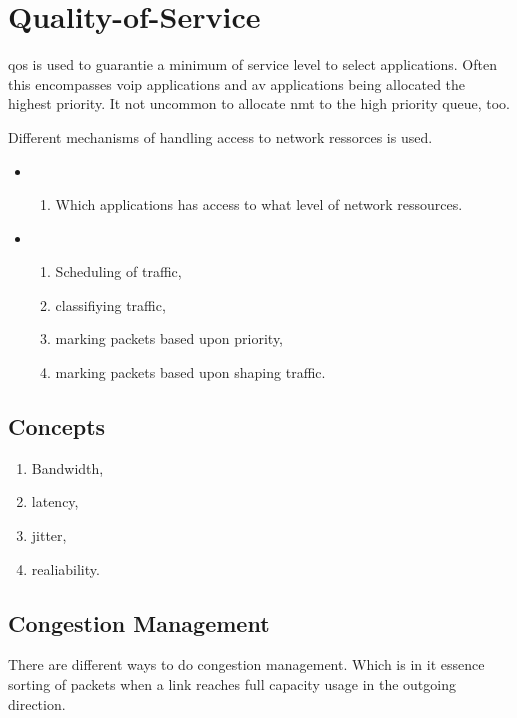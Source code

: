 \chapter[QoS]{Quality-of-Service}

\gls{qos} is used to guarantie a minimum of service level to select applications. Often this encompasses \gls{voip} applications and \gls{av} applications being allocated the highest priority. It not uncommon to allocate \gls{nmt} to the high priority queue, too.

Different mechanisms of handling access to network ressorces is used.
\begin{itemize}
    \item {}
    \begin{enumerate}
        \item Which applications has access to what level of network ressources.
    \end{enumerate}
    \item {}
    \begin{enumerate}
        \item Scheduling of traffic,
        \item classifiying traffic,
        \item marking packets based upon priority,
        \item marking packets based upon shaping traffic.
    \end{enumerate}
\end{itemize}

\section{Concepts}

\begin{enumerate}
    \item Bandwidth,
    \item latency,
    \item jitter,
    \item realiability.
\end{enumerate}

\section[Congestion Mgmt]{Congestion Management}

There are different ways to do congestion management. Which is in it essence sorting of packets when a link reaches full capacity usage in the outgoing direction.

